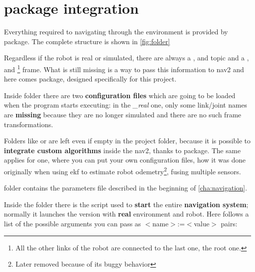 \section{ package integration}

Everything required to navigating through the environment is provided by  package. The complete structure is shown in \autoref{fig:folder}


Regardless if the robot is real or simulated, there are always a ,  and  topic and a ,  and \footnote{All the other links of the robot are connected to the last one, the root one.} frame. What is still missing is a way to pass this information to \acrshort{nav2} and here comes  package, designed specifically for this project.

Inside  folder there are two \textbf{configuration files} which are going to be loaded when the program starts executing: in the \textit{\_real} one, only some link/joint names are \textbf{missing} because they are no longer simulated and there are no such frame transformations. %

Folders like  or  are left even if empty in the project folder, because it is possible to \textbf{integrate custom algorithms} inside the \acrlong{nav2}, thanks to  package. The same applies for  one, where you can put your own configuration files, how it was done originally when using \acrfull{ekf} to estimate robot odemetry\footnote{Later removed because of its buggy behavior}, fusing multiple sensors.

 folder contains the parameters file described in the beginning of \autoref{cha:navigation}.

Inside the  folder there is the script used to \textbf{start} the entire \textbf{navigation system}; normally it launches the version with \textbf{real} environment and robot. Here follows a list of the possible arguments you can pass as $<$name$>$:=$<$value$>$ pairs: %

